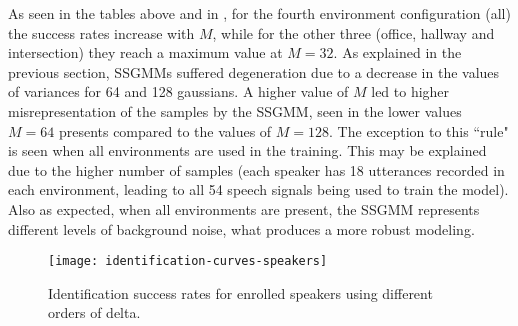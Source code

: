As seen in the tables above and in , for the fourth environment configuration (all) the success rates increase with $M$, while for the other three (office, hallway and intersection) they reach a maximum value at $M = 32$. As explained in the previous section, SSGMMs suffered degeneration due to a decrease in the values of variances for 64 and 128 gaussians. A higher value of $M$ led to higher misrepresentation of the samples by the SSGMM, seen in the lower values $M = 64$ presents compared to the values of $M = 128$. The exception to this ``rule" is seen when all environments are used in the training. This may be explained due to the higher number of samples (each speaker has 18 utterances recorded in each environment, leading to all 54 speech signals being used to train the model). Also as expected, when all environments are present, the SSGMM represents different levels of background noise, what produces a more robust modeling.

\begin{figure}[ht]
    \centering
    \texttt{[image: identification-curves-speakers]}
    \caption{Identification success rates for enrolled speakers using different orders of delta.}
    \label{fig:identification-curves-speakers}
\end{figure}







